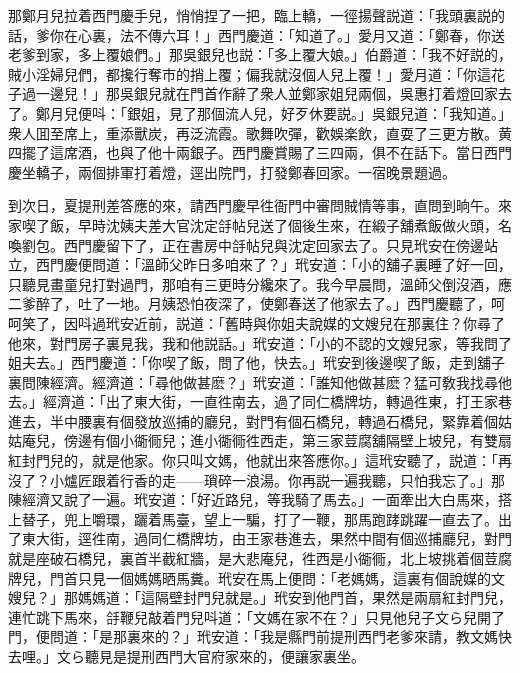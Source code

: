 那鄭月兒拉着西門慶手兒，悄悄捏了一把，臨上轎，一徑揚聲説道：「我頭裏説的話，爹你在心裏，法不傳六耳！」西門慶道：「知道了。」愛月又道：「鄭春，你送老爹到家，多上覆娘們。」那吳銀兒也説：「多上覆大娘。」伯爵道：「我不好説的，賊小淫婦兒們，都攙行奪市的捎上覆；偏我就沒個人兒上覆！」愛月道：「你這花子過一邊兒！」那吳銀兒就在門首作辭了衆人並鄭家姐兒兩個，吳惠打着燈回家去了。鄭月兒便呌：「銀姐，見了那個流人兒，好歹休要説。」吳銀兒道：「我知道。」衆人囬至席上，重添獸炭，再泛流霞。歌舞吹彈，歡娛楽飲，直耍了三更方散。黄四擺了這席酒，也與了他十兩銀子。西門慶賞賜了三四兩，俱不在話下。當日西門慶坐轎子，兩個排軍打着燈，逕出院門，打發鄭春回家。一宿晚景題過。

到次日，夏提刑差答應的來，請西門慶早徃衙門中審問賊情等事，直問到晌午。來家喫了飯，早時沈姨夫差大官沈定㧱帖兒送了個後生來，在緞子舖煮飯做火頭，名喚劉包。西門慶留下了，正在書房中㧱帖兒與沈定回家去了。只見玳安在傍邊站立，西門慶便問道：「溫師父昨日多咱來了？」玳安道：「小的舖子裏睡了好一回，只聽見畫童兒打對過門，那咱有三更時分纔來了。我今早晨問，溫師父倒沒酒，應二爹醉了，吐了一地。月姨恐怕夜深了，使鄭春送了他家去了。」西門慶聽了，呵呵笑了，因呌過玳安近前，説道：「舊時與你姐夫說媒的文嫂兒在那裏住？你尋了他來，對門房子裏見我，我和他説話。」玳安道：「小的不認的文嫂兒家，等我問了姐夫去。」西門慶道：「你喫了飯，問了他，快去。」玳安到後邊喫了飯，走到舖子裏問陳經濟。經濟道：「尋他做甚麽？」玳安道：「誰知他做甚麽？猛可敎我找尋他去。」經濟道：「出了東大街，一直徃南去，過了同仁橋牌坊，轉過徃東，打王家巷進去，半中腰裏有個發放巡捕的廳兒，對門有個石橋兒，轉過石橋兒，緊靠着個姑姑庵兒，傍邊有個小衚衕兒；進小衚衕徃西走，第三家荳腐舖隔壁上坡兒，有雙扇紅封門兒的，就是他家。你只叫文媽，他就出來答應你。」這玳安聽了，説道：「再沒了？小爐匠跟着行香的走——瑣碎一浪湯。你再説一遍我聽，只怕我忘了。」那陳經濟又說了一遍。玳安道：「好近路兒，等我騎了馬去。」一面牽出大白馬來，搭上替子，兜上嚼環，躧着馬臺，望上一騙，打了一鞭，那馬跑踍跳躍一直去了。出了東大街，逕徃南，過同仁橋牌坊，由王家巷進去，果然中間有個巡捕廳兒，對門就是座破石橋兒，裏首半截紅牆，是大悲庵兒，徃西是小衚衕，北上坡挑着個荳腐牌兒，門首只見一個媽媽晒馬糞。玳安在馬上便問：「老媽媽，這裏有個說媒的文嫂兒？」那媽媽道：「這隔壁封門兒就是。」玳安到他門首，果然是兩扇紅封門兒，連忙跳下馬來，㧱鞭兒敲着門兒呌道：「文媽在家不在？」只見他兒子文ら兒開了門，便問道：「是那裏來的？」玳安道：「我是縣門前提刑西門老爹來請，教文媽快去哩。」文ら聽見是提刑西門大官府家來的，便讓家裏坐。

